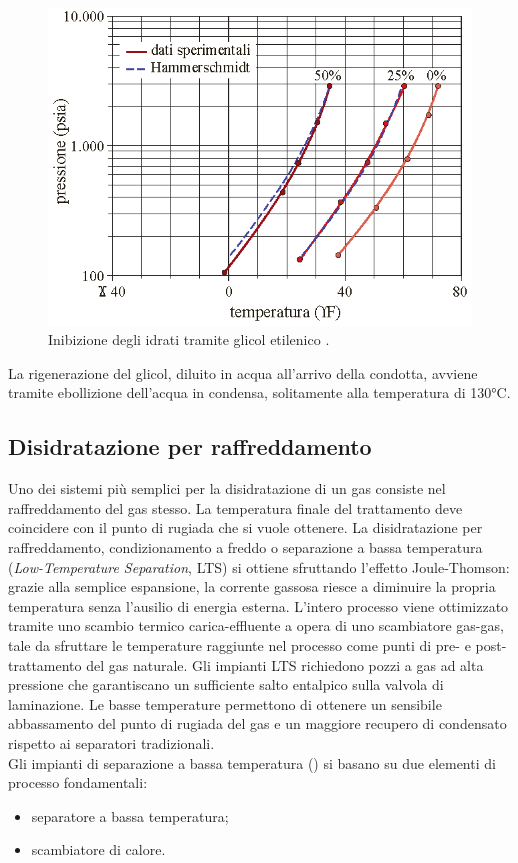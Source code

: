 \begin{figure}[htbp]
    \centering
    \includegraphics[width=.5\textwidth]{fig/impianti/inibizioneidrati.eps}
    \caption{Inibizione degli idrati tramite glicol etilenico \parencite{bianco2005impiantigas}.}
    \label{fig:inibizioneidrati}
\end{figure}

La rigenerazione del glicol, diluito in acqua all'arrivo della condotta, avviene tramite ebollizione dell'acqua in condensa, solitamente alla temperatura di 130°C.

\subsection{Disidratazione per raffreddamento} \label{subsection:lts}
Uno dei sistemi più semplici per la disidratazione di un gas consiste nel raffreddamento del gas stesso. La temperatura finale del trattamento deve coincidere con il punto di rugiada che si vuole ottenere. La disidratazione per raffreddamento, condizionamento a freddo o separazione a bassa temperatura (\textit{Low-Temperature Separation}, LTS) si ottiene sfruttando l'effetto Joule-Thomson: grazie alla semplice espansione, la corrente gassosa riesce a diminuire la propria temperatura senza l'ausilio di energia esterna. L'intero processo viene ottimizzato tramite uno scambio termico carica-effluente a opera di uno scambiatore gas-gas, tale da sfruttare le temperature raggiunte nel processo come punti di pre- e post-trattamento del gas naturale. Gli impianti LTS richiedono pozzi a gas ad alta pressione che garantiscano un sufficiente salto entalpico sulla valvola di laminazione. Le basse temperature permettono di ottenere un sensibile abbassamento del punto di rugiada del gas e un maggiore recupero di condensato rispetto ai separatori tradizionali. \\
Gli impianti di separazione a bassa temperatura () si basano su due elementi di processo fondamentali:
\begin{itemize}
    \item separatore a bassa temperatura;
    \item scambiatore di calore.
\end{itemize}

